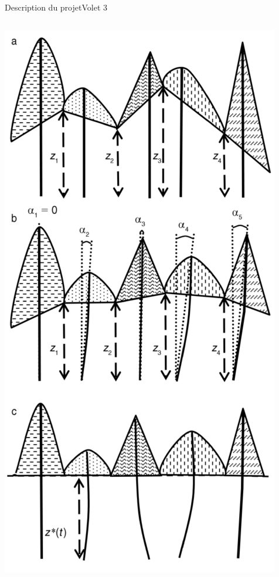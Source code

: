 \documentclass{eecslides}
\begin{document}
	\begin{frame}{Description du projet}{Volet 3}
		\begin{columns}
			\begin{column}{0.5\textwidth}
				\begin{center}
				\includegraphics[height=0.6\textheight]{strigul}\\

\end{center}
\end{column}
\end{columns}
\end{frame}
\end{document}
